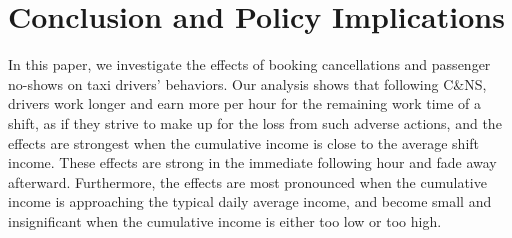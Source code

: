 \documentclass[reviewmode,AEJ]{AEA}
\begin{document}




\section{Conclusion and Policy Implications}
\label{sec:conclude}
In this paper, we investigate the effects of booking cancellations and passenger no-shows on taxi 
drivers' behaviors. Our analysis shows that following C\&NS, drivers work longer and earn more per hour
for the remaining work time of a shift, as if they strive to make up for the loss from such adverse actions, and the effects are strongest when the cumulative income is close to the average shift income. 
These effects are strong in the immediate following hour and fade away afterward. Furthermore, the effects are most pronounced when the cumulative income is approaching the typical daily average income, and become small and insignificant when the cumulative income is either too low or too high.
\end{document}
